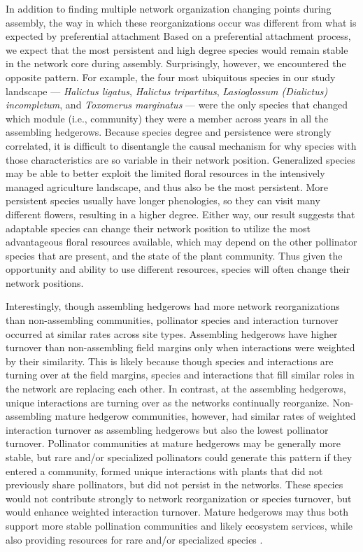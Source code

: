 \documentclass[12pt]{article}
\begin{document}
In addition to finding multiple network organization changing points
during assembly, the way in which these reorganizations occur was
different from what is expected by preferential attachment Based on a
preferential attachment process, we expect that the most persistent
and high degree species would remain stable in the network core during
assembly. Surprisingly, however, we encountered the opposite
pattern. For example, the four most ubiquitous species in our study
landscape --- \textit{Halictus ligatus}, \textit{Halictus
  tripartitus}, \textit{Lasioglossum (Dialictus) incompletum}, and
\textit{Toxomerus marginatus} --- were the only species that changed
which module (i.e., community) they were a member across years in all
the assembling hedgerows. Because species degree and persistence were
strongly correlated, it is difficult to disentangle the causal
mechanism for why species with those characteristics are so variable
in their network position. Generalized species may be able to better
exploit the limited floral resources in the intensively managed
agriculture landscape, and thus also be the most persistent. More
persistent species usually have longer phenologies, so they can visit
many different flowers, resulting in a higher degree. Either way, our
result suggests that adaptable species can change their network
position to utilize the most advantageous floral resources available,
which may depend on the other pollinator species that are present, and
the state of the plant community. Thus given the opportunity and
ability to use different resources, species will often change their
network positions. 

Interestingly, though assembling hedgerows had more network
reorganizations than non-assembling communities, pollinator species
and interaction turnover occurred at similar rates across site types.
Assembling hedgerows have higher turnover than non-assembling field
margins only when interactions were weighted by their similarity. This
is likely because though species and interactions are turning over at
the field margins, species and interactions that fill similar roles in
the network are replacing each other. In contrast, at the assembling
hedgerows, unique interactions are turning over as the networks
continually reorganize. Non-assembling mature hedgerow communities,
however, had similar rates of weighted interaction turnover as
assembling hedgerows but also the lowest pollinator
turnover. Pollinator communities at mature hedgerows may be generally
more stable, but rare and/or specialized pollinators could generate
this pattern if they entered a community, formed unique interactions
with plants that did not previously share pollinators, but did not
persist in the networks. These species would not contribute strongly
to network reorganization or species turnover, but would enhance
weighted interaction turnover. Mature hedgerows may thus both support
more stable pollination communities and likely ecosystem services,
while also providing resources for rare and/or specialized species
\citep{kremen-2015-602, mgonigle-2015-x}.
\end{document}
